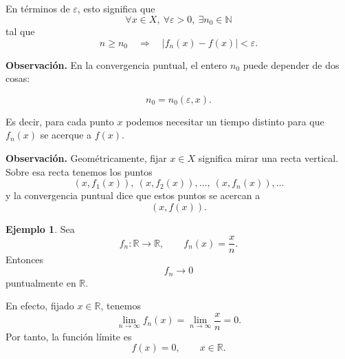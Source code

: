 \documentclass[11pt,a4paper,openany]{book}
\theoremstyle{definition}
\newtheorem{ejemplo}{Ejemplo}[chapter]
\theoremstyle{plain}
\theoremstyle{remark}
\newenvironment{observacion}
{\par\medskip\noindent\textbf{Observación. }\normalfont}
{\par\medskip}
\newcommand{\R}{\mathbb{R}}
\newcommand{\N}{\mathbb{N}}
\begin{document}
En términos de $\varepsilon$, esto significa que
\[
    \forall x\in X,\ \forall \varepsilon>0,\ \exists n_0\in\N
\]
tal que
\[
    n\geq n_0
    \quad\Longrightarrow\quad
    |f_n(x)-f(x)|<\varepsilon.
\]

\begin{observacion}
En la convergencia puntual, el entero $n_0$ puede depender de dos cosas:

\[
    n_0=n_0(\varepsilon,x).
\]

Es decir, para cada punto $x$ podemos necesitar un tiempo distinto para que
$f_n(x)$ se acerque a $f(x)$.
\end{observacion}

\begin{observacion}
Geométricamente, fijar $x\in X$ significa mirar una recta vertical. Sobre esa
recta tenemos los puntos
\[
    (x,f_1(x)),\ (x,f_2(x)),\ldots,\ (x,f_n(x)),\ldots
\]
y la convergencia puntual dice que estos puntos se acercan a
\[
    (x,f(x)).
\]
\end{observacion}

\begin{center}
\end{center}

\begin{ejemplo}
Sea
\[
    f_n:\R\to\R,\qquad f_n(x)=\frac{x}{n}.
\]
Entonces
\[
    f_n\to 0
\]
puntualmente en $\R$.

En efecto, fijado $x\in\R$, tenemos
\[
    \lim_{n\to\infty} f_n(x)
    =
    \lim_{n\to\infty}\frac{x}{n}
    =
    0.
\]
Por tanto, la función límite es
\[
    f(x)=0,\qquad x\in\R.
\]
\end{ejemplo}

\end{document}
